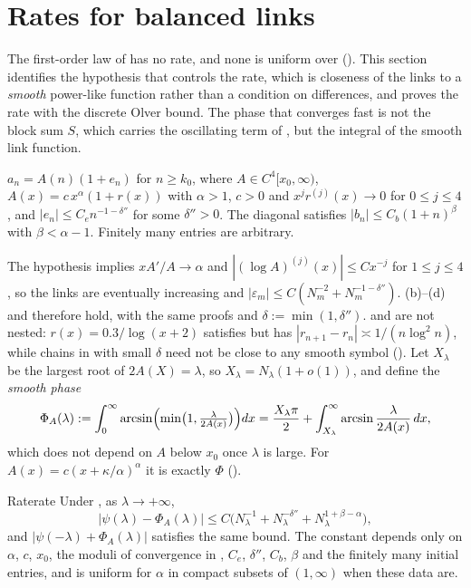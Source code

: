 \section{Rates for balanced links}\label{sec:rates}

The first-order law of  has no rate, and none is uniform over
 (). This section identifies the hypothesis that
controls the rate, which is closeness of the links to a \emph{smooth} power-like function
rather than a condition on differences, and proves the rate with the discrete Olver
bound. The phase that converges fast is not the block sum $S$, which carries the
oscillating term of , but the integral of the smooth link function.

\begin{hypothesis}\label{hyp:A}
$a_n=A(n)(1+e_n)$ for $n\ge k_0$, where $A\in C^4[x_0,\infty)$,
$A(x)=c\,x^\alpha(1+r(x))$ with $\alpha>1$, $c>0$ and $x^jr^{(j)}(x)\to0$ for $0\le j\le4$, and
$|e_n|\le C_en^{-1-\delta''}$ for some $\delta''>0$. The diagonal satisfies
$|b_n|\le C_b(1+n)^\beta$ with $\beta<\alpha-1$. Finitely many entries are arbitrary.
\end{hypothesis}

\noindent The hypothesis implies $xA'/A\to\alpha$ and $|(\log A)^{(j)}(x)|\le Cx^{-j}$ for
$1\le j\le4$, so the links are eventually increasing and
$|\varepsilon_m|\le C(N_m^{-2}+N_m^{-1-\delta''})$. (b)--(d) and 
therefore hold, with the same proofs and $\delta:=\min(1,\delta'')$.  and
 are not nested: $r(x)=0.3/\log(x+2)$ satisfies  but has
$|r_{n+1}-r_n|\asymp1/(n\log^2n)$, while chains in  with small $\delta$ need not
be close to any smooth symbol (). Let $X_\lambda$ be the largest root of
$2A(X)=\lambda$, so $X_\lambda=N_\lambda(1+o(1))$, and define the \emph{smooth phase}
\begin{equation}\label{eq:PhiA}
  \Phi_A(\lambda):=\int_0^\infty\arcsin\Bigl(\min\bigl(1,\tfrac{\lambda}{2A(x)}\bigr)\Bigr)dx
  =\frac{X_\lambda\pi}2+\int_{X_\lambda}^\infty\arcsin\frac{\lambda}{2A(x)}\,dx ,
\end{equation}
which does not depend on $A$ below $x_0$ once $\lambda$ is large. For
$A(x)=c(x+\kappa/\alpha)^\alpha$ it is exactly $\Phi$ ().

\begin{theorem}{Rate}{rate}
Under , as $\lambda\to+\infty$,
\[
  |\psi(\lambda)-\Phi_A(\lambda)|\le C\bigl(N_\lambda^{-1}+N_\lambda^{-\delta''}+N_\lambda^{1+\beta-\alpha}\bigr),
\]
and $|\psi(-\lambda)+\Phi_A(\lambda)|$ satisfies the same bound. The constant depends only on
$\alpha$, $c$, $x_0$, the moduli of convergence in , $C_e$, $\delta''$, $C_b$, $\beta$
and the finitely many initial entries, and is uniform for $\alpha$ in compact subsets of
$(1,\infty)$ when these data are.
\end{theorem}

